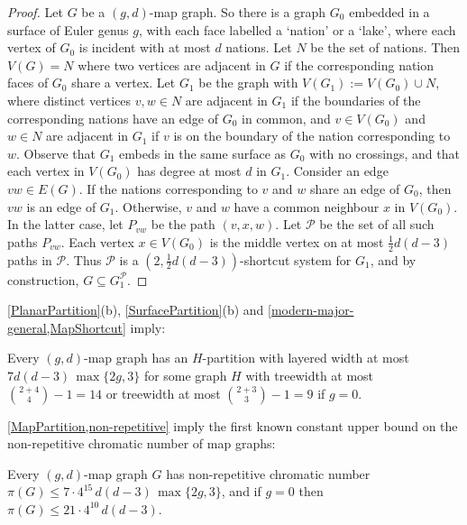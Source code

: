 \documentclass{patmorin}
\newcommand{\PP}{\mathcal{P}}
\renewcommand{\le}{\leqslant}
\begin{document}
\begin{proof}
Let $G$ be a $(g,d)$-map graph. So there is a graph $G_0$ embedded in a surface of Euler genus $g$, with each face labelled a `nation' or a `lake', where each vertex of $G_0$ is incident with at most $d$ nations. Let $N$ be the set of nations. Then $V(G)=N$ where two vertices are adjacent in $G$ if the corresponding nation faces of $G_0$ share a vertex. Let $G_1$ be the graph with $V(G_1):=V(G_0) \cup N$, where distinct vertices $v,w\in N$ are adjacent in $G_1$ if the boundaries of the corresponding nations have an edge of $G_0$ in common, and $v\in V(G_0)$ and $w\in N$ are adjacent in $G_1$ if $v$ is on the boundary of the nation corresponding to $w$. Observe that $G_1$ embeds in the same surface as $G_0$ with no crossings, and that each vertex in $V(G_0)$ has degree at most $d$ in $G_1$. Consider an edge $vw\in E(G)$. If the nations corresponding to $v$ and $w$ share an edge of $G_0$, then $vw$ is an edge of $G_1$. Otherwise,  $v$ and $w$ have a common neighbour $x$ in $V(G_0)$. In the latter case, let $P_{vw}$ be the path $(v,x,w)$. Let $\PP$ be the set of all such paths $P_{vw}$. Each vertex $x\in V(G_0)$ is the middle vertex on at most $\tfrac12 d(d-3)$  paths in $\PP$. Thus $\PP$ is a $(2,\tfrac12 d(d-3))$-shortcut system for $G_1$, and by construction, $G \subseteq G_1^\PP$.
\end{proof}

\cref{PlanarPartition}(b), \cref{SurfacePartition}(b) and \cref{modern-major-general,MapShortcut} imply:

\begin{thm}
\label{MapPartition}
Every $(g,d)$-map graph has an $H$-partition with layered width at most 
$7d(d-3)\, \max\{2g,3\}$ for some graph $H$ with treewidth at most $\binom{2+4}{4}-1=14$ 
or treewidth at most $\binom{2+3}{3}-1=9$ if $g=0$.
%
%
%
\end{thm}

\cref{MapPartition,non-repetitive} imply the first known constant upper bound on the
non-repetitive chromatic number of map graphs:

\begin{cor}
Every $(g,d)$-map graph $G$ has non-repetitive chromatic number 
$\pi(G) \le  7 \cdot 4^{15} \, d(d-3)\, \max\{2g,3\}$, and if $g=0$ then 
$\pi(G) \le  21 \cdot 4^{10} \, d(d-3)$.
\end{cor}
\end{document}
